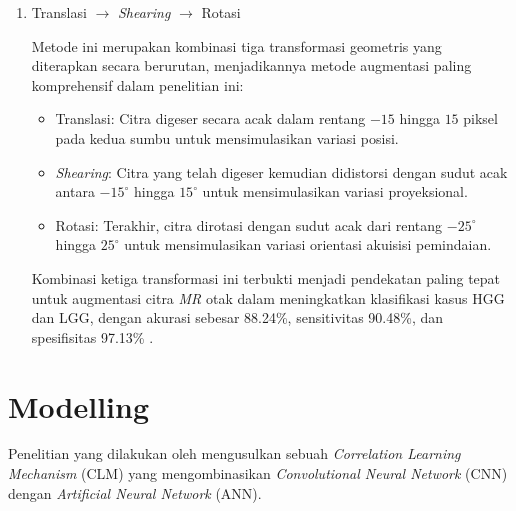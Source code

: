 \begin{enumerate}
\begin{itemize}
		\item \textit{Shearing} (Distorsi Sudut): Setelah ditranslasi, citra 
		kemudian diberikan efek distorsi pada sumbu $x$ dan $y$ dengan sudut yang dipilih 
		secara acak antara $-15^\circ$ hingga $15^\circ$ untuk mensimulasikan variasi 
		proyeksional.
	\end{itemize}
	Berdasarkan pengujian kuantitatif dalam artikel tersebut, metode ini berhasil menghasilkan 
	tingkat akurasi sebesar 85.74\%, sensitivitas 86.16\%, dan spesifisitas 97.65\% pada 
	klasifikasi citra \textit{CT scan} paru.
	
	\item Translasi $\to$ \textit{Shearing} $\to$ Rotasi
	
	Metode ini merupakan kombinasi tiga transformasi geometris yang diterapkan secara 
	berurutan, menjadikannya metode augmentasi paling komprehensif dalam penelitian ini:
	\begin{itemize}
		\item Translasi: Citra digeser secara acak dalam rentang $-15$ hingga $15$ 
		piksel pada kedua sumbu untuk mensimulasikan variasi posisi.
		
		\item \textit{Shearing}: Citra yang telah digeser kemudian didistorsi 
		dengan sudut acak antara $-15^\circ$ hingga $15^\circ$ untuk mensimulasikan variasi 
		proyeksional.
		
		\item Rotasi: Terakhir, citra dirotasi dengan sudut acak dari rentang 
		$-25^\circ$ hingga $25^\circ$ untuk mensimulasikan variasi orientasi akuisisi 
		pemindaian.
		
	\end{itemize}
	
	Kombinasi ketiga transformasi ini terbukti menjadi pendekatan paling tepat untuk 
	augmentasi citra \textit{MR} otak dalam meningkatkan klasifikasi kasus HGG dan LGG, 
	dengan akurasi sebesar 88.24\%, sensitivitas 90.48\%, dan spesifisitas 97.13\% 
	\autocite{goceri2023medical}.
\end{enumerate}

\section{Modelling}

Penelitian yang dilakukan oleh \textcite{wozniak2021deep} mengusulkan sebuah \textit{Correlation Learning Mechanism} (CLM) yang mengombinasikan \textit{Convolutional Neural Network} (CNN) dengan \textit{Artificial Neural Network} (ANN).

